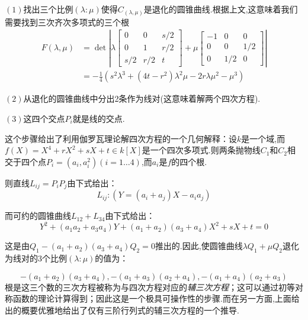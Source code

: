 \documentclass[UTF8]{book}
\begin{document}
		
		$(1)$找出三个比例$(\lambda : \mu)$使得$C_{(\lambda, \mu)}$是退化的圆锥曲线.根据上文,这意味着我们需要找到三次齐次多项式的三个根
		\begin{equation*}
			\begin{aligned} F(\lambda, \mu) &=\operatorname{det}\left|\lambda\left[\begin{array}{ccc}{0} & {0} & {s / 2} \\ {0} & {1} & {r / 2} \\ {s / 2} & {r / 2} & {t}\end{array}\right]+\mu\left[\begin{array}{ccc}{-1} & {0} & {0} \\ {0} & {0} & {1 / 2} \\ {0} & {1 / 2} & {0}\end{array}\right]\right| \\ &=-\frac{1}{4}\left(s^{2} \lambda^{3}+\left(4 t-r^{2}\right) \lambda^{2} \mu-2 r \lambda \mu^{2}-\mu^{3}\right) \end{aligned}
		\end{equation*}
		
		
		$(2)$从退化的圆锥曲线中分出2条作为线对(这意味着解两个四次方程).
		
		
		$(3)$这四个交点$P_{i}$就是线的交点.
		
		
		这个步骤给出了利用伽罗瓦理论解四次方程的一个几何解释：设$k$是一个域,而$f(X)=X^{4}+r X^{2}+s X+t \in k[X]$是一个四次多项式.则两条抛物线$C_{1}$和$C_{2}$相交于四个点$P_{i}=\left(a_{i}, a_{i}^{2}\right)(i = 1\ldots4)$,而$a_{i}$是$f$的四个根.
		
		
		则直线$L_{ij}=P_{i} P_{j}$由下式给出：
		\begin{equation*}
			L_{ij} :\left(Y=\left(a_{i}+a_{j}\right) X-a_{i} a_{j}\right)
		\end{equation*}
		
		而可约的圆锥曲线$L_{12}+L_{34}$由下式给出：
		\begin{equation*}
			Y^{2}+\left(a_{1} a_{2}+a_{3} a_{4}\right) Y+\left(a_{1}+a_{2}\right)\left(a_{3}+a_{4}\right) X^{2}+s X+t=0
		\end{equation*}
	
		这是由$Q_{1}-\left(a_{1}+a_{2}\right)\left(a_{3}+a_{4}\right) Q_{2}=0$推出的.因此,使圆锥曲线$\lambda Q_{1}+\mu Q_{2}$退化为线对的3个比例$(\lambda : \mu)$的值为：
		
		\begin{equation*}
			-\left(a_{1}+a_{2}\right)\left(a_{3}+a_{4}\right),-\left(a_{1}+a_{3}\right)\left(a_{2}+a_{4}\right),-\left(a_{1}+a_{4}\right)\left(a_{2}+a_{3}\right)
		\end{equation*}
		根是这三个数的三次方程被称为与四次方程对应的\textit{辅三次方程}；这可以通过初等对称函数的理论计算得到；因此这是一个极具可操作性的步骤.而在另一方面,上面给出的概要优雅地给出了仅有三阶行列式的辅三次方程的一个推导.
		
\end{document}

